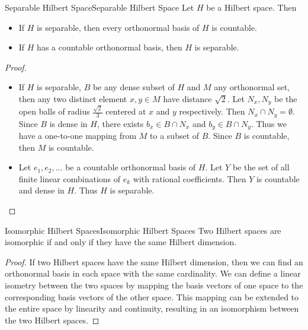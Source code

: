 \documentclass[../main.tex]{subfiles}
\begin{document}
\begin{theorem}{Separable Hilbert Space}{Separable Hilbert Space}
	Let $H$ be a Hilbert space. Then
	\begin{itemize}
		\item If $H$ is separable, then every orthonormal basis of $H$ is countable.
		\item If $H$ has a countable orthonormal basis, then $H$ is separable.
	\end{itemize}
\end{theorem}
\begin{proof}
\begin{itemize}
	\item If $H$ is separable, $B$ be any dense subset of $H$ and $M$ any orthonormal set, then any two distinct element $x,y\in M$ have distance $\sqrt{2}$. Let $N_x,N_y$ be the open balls of radius $\frac{\sqrt{2}}{3}$ centered at $x$ and $y$ respectively. Then $N_x \cap N_y = \emptyset$. Since $B$ is dense in $H$, there exists $b_x \in B \cap N_x$ and $b_y \in B \cap N_y$. Thus we have a one-to-one mapping from $M$ to a subset of $B$. Since $B$ is countable, then $M$ is countable.
	\item Let $e_1, e_2, \ldots $ be a countable orthonormal basis of $H$. Let $Y$ be the set of all finite linear combinations of $e_k$ with rational coefficients. Then $Y$ is countable and dense in $H$. Thus $H$ is separable.
\end{itemize}
\end{proof}

\begin{theorem}{Isomorphic Hilbert Spaces}{Isomorphic Hilbert Spaces}
	Two Hilbert spaces are isomorphic if and only if they have the same Hilbert dimension.
\end{theorem}
\begin{proof}
If two Hilbert spaces have the same Hilbert dimension, then we can find an orthonormal basis in each space with the same cardinality. We can define a linear isometry between the two spaces by mapping the basis vectors of one space to the corresponding basis vectors of the other space. This mapping can be extended to the entire space by linearity and continuity, resulting in an isomorphism between the two Hilbert spaces.
\end{proof}
\end{document}
